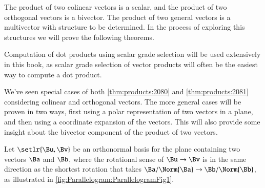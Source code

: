 %
%
The product of two colinear vectors is a scalar, and the product of two orthogonal vectors is a bivector.
The product of two general vectors is a multivector with structure to be determined.  In the process of exploring this structures we will prove the following theorems.

\index{\(\Ba \cdot \Bb\)}

Computation of dot products using scalar grade selection will be used extensively in this book, as scalar
grade selection of vector products will often be the easiest way to compute a dot product.


We've seen special cases of both
\cref{thm:products:2080}
and
\cref{thm:products:2081}
considering colinear and orthogonal vectors.
The more general cases will be proven in two ways, first using a polar representation of two vectors in a plane, and then using
a coordinate expansion of the vectors.  This will also provide some insight about the bivector component of the product of two vectors.

Let \( \setlr{\Bu, \Bv} \) be an orthonormal basis for the plane containing
two vectors \( \Ba \) and \( \Bb \), where the rotational sense of \( \Bu \rightarrow \Bv \) is in the same direction as the shortest rotation that takes \( \Ba/\Norm{\Ba} \rightarrow \Bb/\Norm{\Bb} \), as
illustrated in
\cref{fig:Parallelogram:ParallelogramFig1}.

